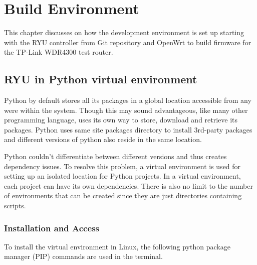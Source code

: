 \chapter{Build Environment} \label{ch:build_environment}
This chapter discusses on how the development environment is set up starting with the RYU controller from Git repository and OpenWrt to build firmware for the TP-Link WDR4300 test router.
\section{RYU in Python virtual environment \cite{Install_virtualenv}} \label{virtualenv}
Python by default stores all its packages in a global location accessible from any were within the system. Though this may sound advantageous, like many other programming language, uses its own way to store, download and retrieve its packages. Python uses same site packages directory to install 3rd-party packages and different versions of python also reside in the same location. 

Python couldn’t differentiate between different versions and thus creates dependency issues. To resolve this problem, a virtual environment is used for setting up an isolated location for Python projects. In a virtual environment, each project can have its own dependencies. There is also no limit to the number of environments that can be created since they are just directories containing scripts. 

\subsection{Installation and Access \cite{Install_virtualenv} \cite{Install_RyuSDN}} \label{RYU_install}

To install the virtual environment in Linux, the following python package manager (PIP) commands are used in the terminal.

